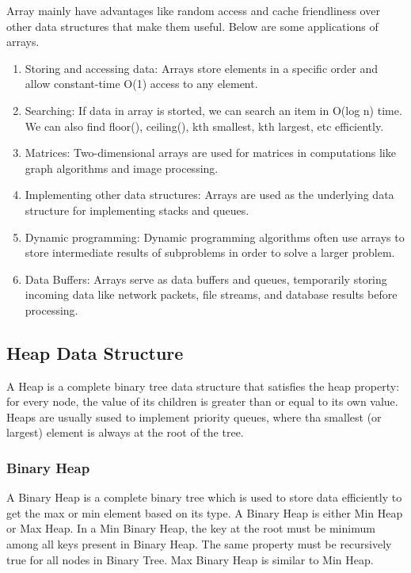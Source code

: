 Array mainly have advantages like random access and cache friendliness
over other data structures that make them useful.
Below are some applications of arrays.
\begin{enumerate}
    \item Storing and accessing data: Arrays store elements in a
        specific order and allow constant-time O(1) access to any
        element.
    \item Searching: If data in array is storted, we can search an item
        in O(log n) time. We can also find floor(), ceiling(), kth
        smallest, kth largest, etc efficiently.
    \item Matrices: Two-dimensional arrays are used for matrices in
        computations like graph algorithms and image processing.
    \item Implementing other data structures: Arrays are used as the
        underlying data structure for implementing stacks and queues.
    \item Dynamic programming: Dynamic programming algorithms often use
        arrays to store intermediate results of subproblems in order to
        solve a larger problem.
    \item Data Buffers: Arrays serve as data buffers and queues,
        temporarily storing incoming data like network packets, file
        streams, and database results before processing.
\end{enumerate}


\subsection{Heap Data Structure}
A Heap is a complete binary tree data structure that satisfies the heap
property: for every node, the value of its children is greater than or
equal to its own value. Heaps are usually sused to implement priority
queues, where tha smallest (or largest) element is always at the root of
the tree.

\subsubsection{Binary Heap}
A Binary Heap is a complete binary tree which is used to store data
efficiently to get the max or min element based on its type. A Binary
Heap is either Min Heap or Max Heap. In a Min Binary Heap, the key at
the root must be minimum among all keys present in Binary Heap. The same
property must be recursively true for all nodes in Binary Tree. Max
Binary Heap is similar to Min Heap.

